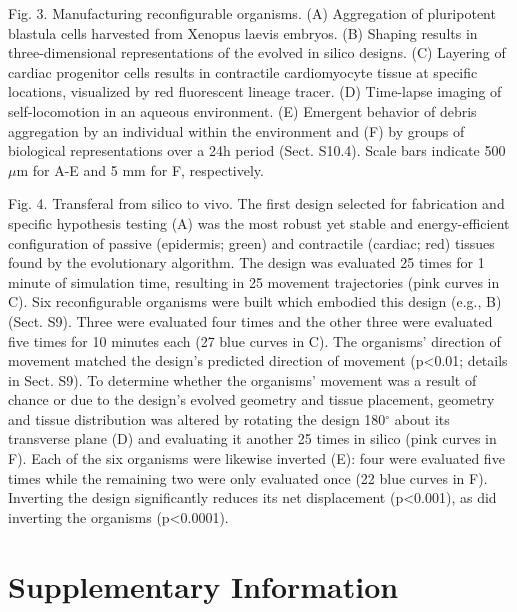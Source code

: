 Fig. 3.  Manufacturing reconfigurable organisms. (A) Aggregation of pluripotent blastula cells harvested from Xenopus laevis embryos. (B) Shaping results in three-dimensional representations of the evolved in silico designs. (C) Layering of cardiac progenitor cells results in contractile cardiomyocyte tissue at specific locations, visualized by red fluorescent lineage tracer. (D) Time-lapse imaging of self-locomotion in an aqueous environment. (E) Emergent behavior of debris aggregation by an individual within the environment and (F) by groups of biological representations over a 24h period (Sect. S10.4). Scale bars indicate 500 {$\mu$}m for A-E and 5 mm for F, respectively.



Fig. 4.  Transferal from silico to vivo. The first design selected for fabrication and specific hypothesis testing (A) was the most robust yet stable and energy-efficient configuration of passive (epidermis; green) and contractile (cardiac; red) tissues found by the evolutionary algorithm. The design was evaluated 25 times for 1 minute of simulation time, resulting in 25 movement trajectories (pink curves in C). Six reconfigurable organisms were built which embodied this design (e.g., B) (Sect. S9). Three were evaluated four times and the other three were evaluated five times for 10 minutes each (27 blue curves in C). The organisms' direction of movement matched the design's predicted direction of movement (p<0.01; details in Sect. S9). To determine whether the organisms' movement was a result of chance or due to the design's evolved geometry and tissue placement, geometry and tissue distribution was altered by rotating the design 180{$^{\circ}$} about its transverse plane (D) and evaluating it another 25 times in silico (pink curves in F). Each of the six organisms were likewise inverted (E): four were evaluated five times while the remaining two were only evaluated once (22 blue curves in F). Inverting the design significantly reduces its net displacement (p<0.001), as did inverting the organisms (p<0.0001).






\section{Supplementary Information}


